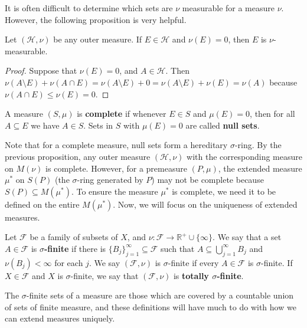 	It is often difficult to determine which sets are $\nu$ measurable for a measure $\nu$. However, the following proposition 
	is very helpful.
	
	\begin{prop}
		Let $(\mathcal H, \nu)$ be any outer measure. If $E\in\mathcal H$ and $\nu(E) = 0$, then $E$ is $\nu$-measurable.
	\end{prop}
	
	\begin{proof}
		Suppose that $\nu(E) = 0$, and $A\in\mathcal H$. Then $\nu(A\setminus E) + \nu(A\cap E) = \nu(A\setminus E) + 0 = 
		\nu(A\setminus E) + \nu(E) = \nu(A)$ because $\nu(A\cap E)\leq\nu(E) = 0$.
	\end{proof}
	
	\begin{definition}
		A measure $(S, \mu)$ is \textbf{complete} if whenever $E\in S$ and $\mu(E) = 0$, then for all $A\subseteq E$ we 
		have $A\in S$. Sets in $S$ with $\mu(E) = 0$ are called \textbf{null sets}.
	\end{definition}
	
	Note that for a complete measure, null sets form a hereditary $\sigma$-ring. By the previous proposition, any outer 
	measure $(\mathcal H, \nu)$ with the corresponding measure on $M(\nu)$ is complete. However, for a premeasure $(P, 
	\mu)$, the extended measure $\mu^*$ on $S(P)$ (the $\sigma$-ring generated by $P$) may not be complete because 
	$S(P)\subseteq M(\mu^*)$. To ensure the measure $\mu^*$ is complete, we need it to be defined on the entire 
	$M(\mu^*)$. Now, we will focus on the uniqueness of extended measures. 
	
	\begin{definition}
		Let $\mathcal F$ be a family of subsets of $X$, and $\nu : \mathcal F\rightarrow\mathbb R^+\cup\{\infty\}$. We say 
		that a set $A\in\mathcal F$ is \textbf{$\sigma$-finite} if there is $\{B_j\}_{j = 1}^\infty\subseteq\mathcal F$ such that 
		$A\subseteq \bigcup_{j = 1}^\infty B_j$ and $\nu(B_j) < \infty$ for each $j$. We say $(\mathcal F, \nu)$ is 
		$\sigma$-finite if every $A\in\mathcal F$ is $\sigma$-finite. If $X\in\mathcal F$ and $X$ is $\sigma$-finite, we say 
		that $(\mathcal F, \nu)$ is \textbf{totally $\sigma$-finite}. 
	\end{definition}
	
	The $\sigma$-finite sets of a measure are those which are covered by a countable union of sets of finite measure, and 
	these definitions will have much to do with how we can extend measures uniquely. 
	
